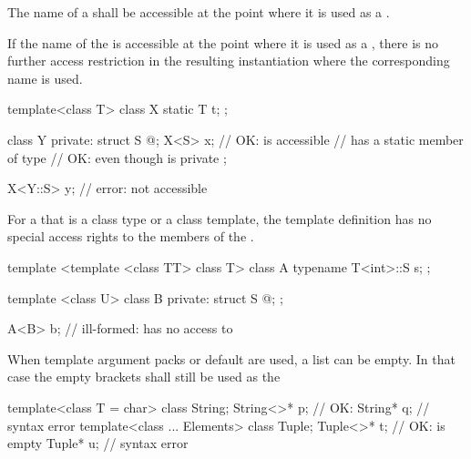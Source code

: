 \pnum
The name of a
shall be accessible at the point where it is used as a
.
\begin{note}
If the name of the
is accessible at the point where it is used as a
,
there is no further access restriction in the resulting instantiation where the
corresponding
name is used.
\end{note}
\begin{example}

\begin{codeblock}
template<class T> class X {
  static T t;
};

class Y {
private:
  struct S { @\commentellip@ };
  X<S> x;           // OK:  is accessible
                    //  has a static member of type 
                    // OK: even though  is private
};

X<Y::S> y;          // error:  not accessible
\end{codeblock}
\end{example}
For a
that is a class type or a class template, the template
definition has no special access rights to the
members of the . \begin{example}

\begin{codeblock}
template <template <class TT> class T> class A {
  typename T<int>::S s;
};

template <class U> class B {
private:
  struct S { @\commentellip@ };
};

A<B> b;             // ill-formed:  has no access to 
\end{codeblock}
\end{example}

\pnum
When template argument packs or default
are used, a
list can be empty.
In that case the empty
\tcode{<>}
brackets shall still be used as the
\begin{example}

\begin{codeblock}
template<class T = char> class String;
String<>* p;                    // OK: 
String* q;                      // syntax error
template<class ... Elements> class Tuple;
Tuple<>* t;                     // OK:  is empty
Tuple* u;                       // syntax error
\end{codeblock}
\end{example}

